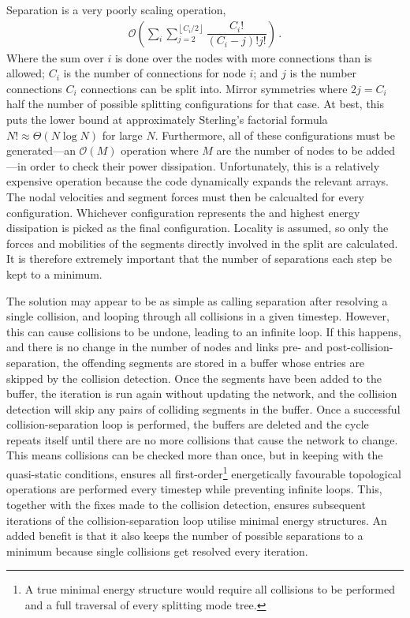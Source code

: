Separation is a very poorly scaling operation,
\begin{align}
    \mathcal{O}\left(\sum\limits_{i}\sum\limits_{j=2}^{\left\lfloor C_i/2 \right\rfloor} \dfrac{C_i!}{(C_i-j)! j!}\right)\,.
\end{align}
Where the sum over $i$ is done over the nodes with more connections than is allowed; $C_i$ is the number of connections for node $i$; and $j$ is the number connections $C_i$ connections can be split into. Mirror symmetries where $2j = C_i$ half the number of possible splitting configurations for that case. At best, this puts the lower bound at approximately Sterling's factorial formula $N! \approx \mathcal{\Theta}(N\log{N})$ for large $N$. Furthermore, all of these configurations must be generated---an $\mathcal{O}(M)$ operation where $M$ are the number of nodes to be added---in order to check their power dissipation. Unfortunately, this is a relatively expensive operation because the code dynamically expands the relevant arrays. The nodal velocities and segment forces must then be calcualted for every configuration. Whichever configuration represents the and highest energy dissipation is picked as the final configuration. Locality is assumed, so only the forces and mobilities of the segments directly involved in the split are calculated. It is therefore extremely important that the number of separations each step be kept to a minimum.

The solution may appear to be as simple as calling separation after resolving a single collision, and looping through all collisions in a given timestep. However, this can cause collisions to be undone, leading to an infinite loop. If this happens, and there is no change in the number of nodes and links pre- and post-collision-separation, the offending segments are stored in a buffer whose entries are skipped by the collision detection. Once the segments have been added to the buffer, the iteration is run again without updating the network, and the collision detection will skip any pairs of colliding segments in the buffer. Once a successful collision-separation loop is performed, the buffers are deleted and the cycle repeats itself until there are no more collisions that cause the network to change. This means collisions can be checked more than once, but in keeping with the quasi-static conditions, ensures all first-order\footnote{A true minimal energy structure would require all collisions to be performed and a full traversal of every splitting mode tree.} energetically favourable topological operations are performed every timestep while preventing infinite loops. This, together with the fixes made to the collision detection, ensures subsequent iterations of the collision-separation loop utilise minimal energy structures. An added benefit is that it also keeps the number of possible separations to a minimum because single collisions get resolved every iteration.

